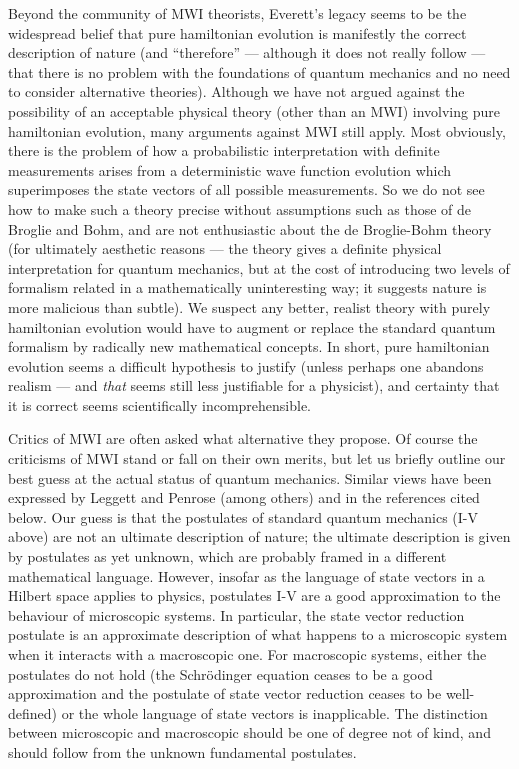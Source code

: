 \documentclass[aps,pra,12pt]{revtex4}
\begin{document}
Beyond the community of MWI theorists, Everett's legacy seems to be
the widespread belief that pure hamiltonian evolution is manifestly
the correct description of nature (and ``therefore'' --- although it
does not really follow --- that there is no problem with the foundations
of quantum mechanics and no need to consider alternative theories). 
Although we have not argued against the possibility of an acceptable physical
theory (other than an MWI)
involving pure hamiltonian evolution, many arguments against MWI still
apply. Most obviously, there is the problem of how a probabilistic 
interpretation with definite measurements arises from a deterministic
wave function evolution which superimposes the state vectors of all possible
measurements. 
So we do not see how to make such a theory precise without assumptions such as
those of de Broglie\cite{db} and Bohm,\cite{bohm} and are
not enthusiastic about the de Broglie-Bohm theory (for ultimately
aesthetic reasons --- the theory gives a definite 
physical interpretation for quantum mechanics,
but at the cost of introducing two levels of formalism related
in a mathematically uninteresting way; it suggests nature is
more malicious than subtle).  We suspect any better, realist theory
with purely hamiltonian evolution would have to augment or replace the
standard quantum formalism by radically new mathematical concepts.
In short, pure hamiltonian evolution seems a difficult hypothesis to
justify (unless perhaps one abandons realism --- and {\em that} seems
still less justifiable for a physicist), 
and certainty that it is correct seems 
scientifically incomprehensible.

Critics of MWI are often asked what alternative they propose.   
Of course the criticisms of MWI stand or fall
on their own merits, but let us briefly outline our best guess at the
actual status of quantum mechanics. 
Similar views have been expressed by Leggett\cite{leggett} and 
Penrose\cite{penrose} (among others) and in the references cited below. 
Our guess is that the postulates of standard quantum mechanics (I-V above)
are not an ultimate description of nature; the ultimate description is
given by postulates as yet unknown, which are probably framed in a
different mathematical language.
However, insofar as the language of state vectors in a Hilbert space applies
to physics, postulates I-V are a good approximation to the behaviour of 
microscopic systems. In particular, the state vector reduction postulate
is an approximate description of what happens to a microscopic
system when it interacts with a macroscopic one. 
For macroscopic systems, either the postulates do not
hold (the Schr\"{o}dinger equation ceases to be a good approximation and 
the postulate of state vector reduction ceases to be well-defined)
or the whole language of state vectors is inapplicable.  
The distinction between microscopic and macroscopic should be one of degree
not of kind, and should follow from the unknown fundamental postulates. 
\end{document}
